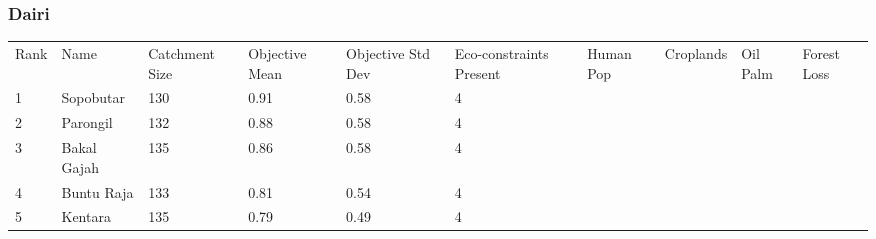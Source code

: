 \subsubsection{Dairi}
\begin{table}[ht]
\centering
\begingroup\fontsize{8pt}{9pt}\selectfont
\begin{tabular}{C{0.03\textwidth}C{0.12\textwidth}C{0.09\textwidth}C{0.08\textwidth}C{0.08\textwidth}C{0.08\textwidth}C{0.07\textwidth}C{0.07\textwidth}C{0.07\textwidth}C{0.07\textwidth}}
 Rank & Name & Catchment Size & Objective Mean & Objective Std Dev & Eco-constraints  Present & Human Pop & Croplands & Oil Palm & Forest Loss \\ 
 {1} & Sopobutar & 130 & \textcolor[HTML]{FFFFFF}{0.91} & \textcolor[HTML]{FFFFFF}{0.58} & \textcolor[HTML]{000000}{4} &  &  &  &  \\ 
  {2} & Parongil & 132 & \textcolor[HTML]{FFFFFF}{0.88} & \textcolor[HTML]{FFFFFF}{0.58} & \textcolor[HTML]{000000}{4} &  &  &  &  \\ 
  {3} & Bakal Gajah & 135 & \textcolor[HTML]{FFFFFF}{0.86} & \textcolor[HTML]{FFFFFF}{0.58} & \textcolor[HTML]{000000}{4} &  &  &  &  \\ 
  {4} & Buntu Raja & 133 & \textcolor[HTML]{FFFFFF}{0.81} & \textcolor[HTML]{FFFFFF}{0.54} & \textcolor[HTML]{000000}{4} &  &  &  &  \\ 
  {5} & Kentara & 135 & \textcolor[HTML]{FFFFFF}{0.79} & \textcolor[HTML]{000000}{0.49} & \textcolor[HTML]{000000}{4} &  &  &  &  \\ 

\end{tabular}
\end{table}
